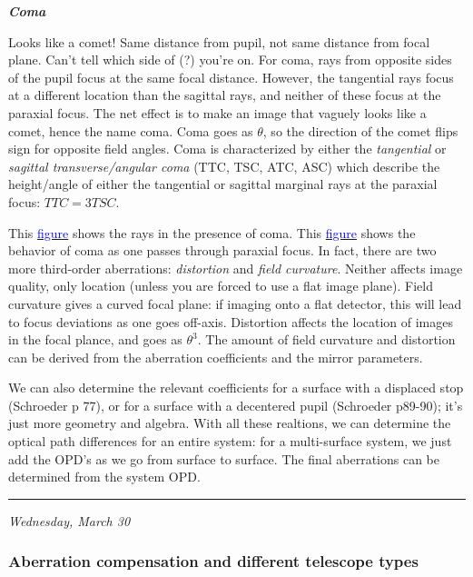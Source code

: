 \documentclass[12pt]{article}
\begin{document}
\textbf{\emph{Coma}}

\textcolor{myBlue}{%
    Looks like a comet! Same distance from pupil, not same distance
    from focal plane. Can't tell which side of (?) you're on.
}
For coma, rays from opposite sides of the pupil focus at the same
focal distance. However, the tangential rays focus at a different
location than the sagittal rays, and neither of these focus at the
paraxial focus. The net effect is to make an image that vaguely looks
like a comet, hence the name coma. Coma goes as $\theta$, so the
direction of the comet flips sign for opposite field angles. Coma is
characterized by either the \emph{tangential} or \emph{sagittal
transverse/angular coma} (TTC, TSC, ATC, ASC) which describe the
height/angle of either the tangential or sagittal marginal rays at the
paraxial focus: $TTC = 3TSC$.

This \href{http://astronomy.nmsu.edu/holtz/a535/html/diagrams/a535/coma.htm}
{\textcolor{blue}{figure}} shows the rays in the presence of coma.
This \href{http://astronomy.nmsu.edu/holtz/a535/html/diagrams/a535/z7.htm}
{\textcolor{blue}{figure}} shows the behavior of coma as one passes
through paraxial focus.
In fact, there are two more third-order aberrations:
\emph{distortion} and \emph{field curvature}.
Neither affects image quality, only location (unless
you are forced to use a flat image plane). Field curvature gives a
curved focal plane: if imaging onto a flat detector, this will lead to
focus deviations as one goes off-axis. Distortion affects the location
of images in the focal plance, and goes as $\theta^{3}$.
The amount of field curvature and distortion can be derived from the
aberration coefficients and the mirror parameters.

We can also determine the relevant coefficients for a surface with a
displaced stop (Schroeder p 77), or for a surface with a decentered
pupil (Schroeder p89-90); it's just more geometry and algebra. With
all these realtions, we can determine the optical path differences for
an entire system: for a multi-surface system, we just add the OPD's as
we go from surface to surface. The final aberrations can be determined
from the system OPD.

\rule{\textwidth}{0.4pt}

{\small\hfill\emph{Wednesday, March 30}}

\subsubsection{Aberration compensation and different telescope types}
\end{document}
